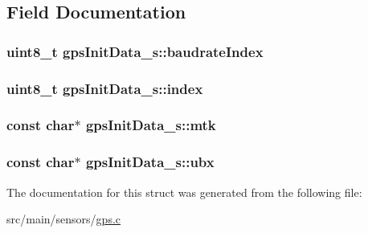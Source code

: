 \subsection{Field Documentation}
\hypertarget{structgpsInitData__s_ac2e584cfb772b72fa113262cecc719a9}{
\subsubsection[{baudrate\+Index}]{\setlength{\rightskip}{0pt plus 5cm}uint8\+\_\+t gps\+Init\+Data\+\_\+s\+::baudrate\+Index}}\label{structgpsInitData__s_ac2e584cfb772b72fa113262cecc719a9}
\hypertarget{structgpsInitData__s_a1e2c6d0efb6ee89815fd9bd8cc500820}{
\subsubsection[{index}]{\setlength{\rightskip}{0pt plus 5cm}uint8\+\_\+t gps\+Init\+Data\+\_\+s\+::index}}\label{structgpsInitData__s_a1e2c6d0efb6ee89815fd9bd8cc500820}
\hypertarget{structgpsInitData__s_a2db8f89dd128d262d4d8b9f69926cf95}{
\subsubsection[{mtk}]{\setlength{\rightskip}{0pt plus 5cm}const char$\ast$ gps\+Init\+Data\+\_\+s\+::mtk}}\label{structgpsInitData__s_a2db8f89dd128d262d4d8b9f69926cf95}
\hypertarget{structgpsInitData__s_a7b6ee64b437363a14bd0e93d41962f7e}{
\subsubsection[{ubx}]{\setlength{\rightskip}{0pt plus 5cm}const char$\ast$ gps\+Init\+Data\+\_\+s\+::ubx}}\label{structgpsInitData__s_a7b6ee64b437363a14bd0e93d41962f7e}


The documentation for this struct was generated from the following file\+:\begin{DoxyCompactItemize}
\item 
src/main/sensors/\hyperlink{gps_8c}{gps.\+c}\end{DoxyCompactItemize}
